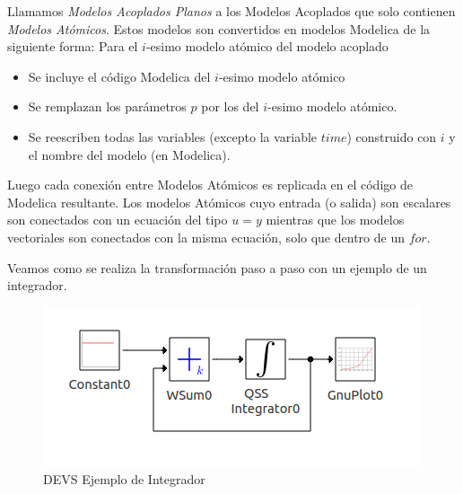 \documentclass[a4paper,	11pt]{report}
\begin{document}
Llamamos \emph{Modelos Acoplados Planos} a los Modelos Acoplados que solo contienen \emph{Modelos Atómicos}. Estos modelos son convertidos en modelos Modelica de la siguiente forma:
Para el $i$-esimo modelo atómico del modelo acoplado
\begin{itemize}
	\item Se incluye el código Modelica del $i$-esimo modelo atómico
	\item Se remplazan los parámetros $p$ por los del $i$-esimo modelo atómico.
	\item Se reescriben todas las variables (excepto la variable $time$) construido con $i$ y el nombre del modelo (en Modelica).
\end{itemize}

Luego cada conexión entre Modelos Atómicos es replicada en el código de Modelica resultante. Los modelos Atómicos cuyo entrada (o salida) son escalares son conectados con un ecuación del tipo $u = y$ mientras que los modelos vectoriales son conectados con la misma ecuación, solo que dentro de un $for$.

Veamos como se realiza la transformación paso a paso con un ejemplo de un integrador.

\begin{figure}[!htbp]
\begin{center}
  \includegraphics[scale=0.5]{integrator-devs}
  \caption{DEVS Ejemplo de Integrador}
  \end{center}
   \label{fig:integrator}
\end{figure}
\end{document}

